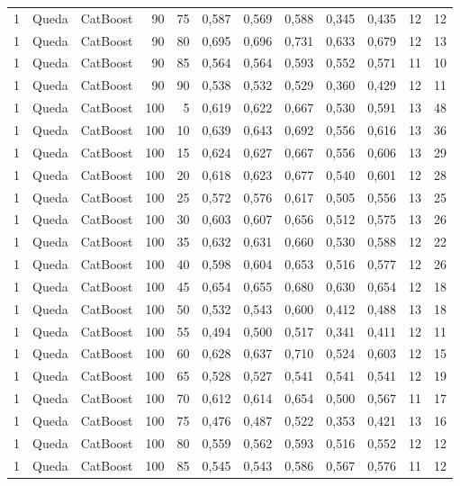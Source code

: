 \begin{longtable}{@{}rllrrrrrrrrr@{}}
1 & Queda & CatBoost & 90 & 75 & 0,587 & 0,569 & 0,588 & 0,345 & 0,435 & 12 & 12 \\
1 & Queda & CatBoost & 90 & 80 & 0,695 & 0,696 & 0,731 & 0,633 & 0,679 & 12 & 13 \\
1 & Queda & CatBoost & 90 & 85 & 0,564 & 0,564 & 0,593 & 0,552 & 0,571 & 11 & 10 \\
1 & Queda & CatBoost & 90 & 90 & 0,538 & 0,532 & 0,529 & 0,360 & 0,429 & 12 & 11 \\
1 & Queda & CatBoost & 100 & 5 & 0,619 & 0,622 & 0,667 & 0,530 & 0,591 & 13 & 48 \\
1 & Queda & CatBoost & 100 & 10 & 0,639 & 0,643 & 0,692 & 0,556 & 0,616 & 13 & 36 \\
1 & Queda & CatBoost & 100 & 15 & 0,624 & 0,627 & 0,667 & 0,556 & 0,606 & 13 & 29 \\
1 & Queda & CatBoost & 100 & 20 & 0,618 & 0,623 & 0,677 & 0,540 & 0,601 & 12 & 28 \\
1 & Queda & CatBoost & 100 & 25 & 0,572 & 0,576 & 0,617 & 0,505 & 0,556 & 13 & 25 \\
1 & Queda & CatBoost & 100 & 30 & 0,603 & 0,607 & 0,656 & 0,512 & 0,575 & 13 & 26 \\
1 & Queda & CatBoost & 100 & 35 & 0,632 & 0,631 & 0,660 & 0,530 & 0,588 & 12 & 22 \\
1 & Queda & CatBoost & 100 & 40 & 0,598 & 0,604 & 0,653 & 0,516 & 0,577 & 12 & 26 \\
1 & Queda & CatBoost & 100 & 45 & 0,654 & 0,655 & 0,680 & 0,630 & 0,654 & 12 & 18 \\
1 & Queda & CatBoost & 100 & 50 & 0,532 & 0,543 & 0,600 & 0,412 & 0,488 & 13 & 18 \\
1 & Queda & CatBoost & 100 & 55 & 0,494 & 0,500 & 0,517 & 0,341 & 0,411 & 12 & 11 \\
1 & Queda & CatBoost & 100 & 60 & 0,628 & 0,637 & 0,710 & 0,524 & 0,603 & 12 & 15 \\
1 & Queda & CatBoost & 100 & 65 & 0,528 & 0,527 & 0,541 & 0,541 & 0,541 & 12 & 19 \\
1 & Queda & CatBoost & 100 & 70 & 0,612 & 0,614 & 0,654 & 0,500 & 0,567 & 11 & 17 \\
1 & Queda & CatBoost & 100 & 75 & 0,476 & 0,487 & 0,522 & 0,353 & 0,421 & 13 & 16 \\
1 & Queda & CatBoost & 100 & 80 & 0,559 & 0,562 & 0,593 & 0,516 & 0,552 & 12 & 12 \\
1 & Queda & CatBoost & 100 & 85 & 0,545 & 0,543 & 0,586 & 0,567 & 0,576 & 11 & 12 \\

\end{longtable}
